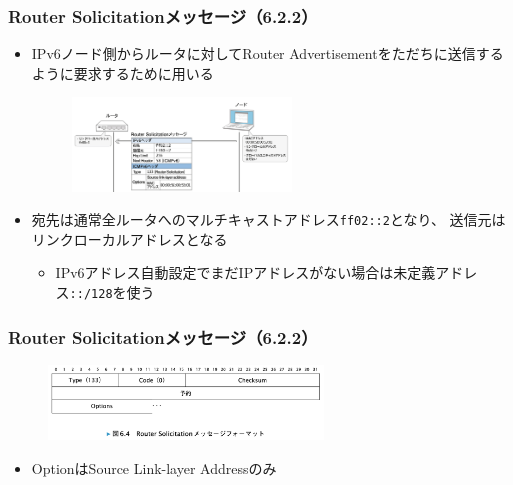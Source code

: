 \begin{frame}
  \frametitle{Router Solicitationメッセージ（6.2.2）}

  \begin{itemize}
    \item IPv6ノード側からルータに対してRouter Advertisementをただちに送信するように要求するために用いる
    \begin{center}
      \begin{figure}
        \includegraphics[width=0.55\textwidth]{img/figure6_2.png}
      \end{figure}
    \end{center}

    \item 宛先は通常全ルータへのマルチキャストアドレス\lstinline|ff02::2|となり、
    送信元はリンクローカルアドレスとなる
    \begin{itemize}
      \item IPv6アドレス自動設定でまだIPアドレスがない場合は未定義アドレス\lstinline|::/128|を使う
    \end{itemize}
  \end{itemize}
\end{frame}

\begin{frame}
  \frametitle{Router Solicitationメッセージ（6.2.2）}

  \begin{center}
    \begin{figure}
      \includegraphics[width=0.65\textwidth]{img/figure6_4.png}
    \end{figure}
  \end{center}

  \begin{itemize}
    \item OptionはSource Link-layer Addressのみ
  \end{itemize}
\end{frame}

